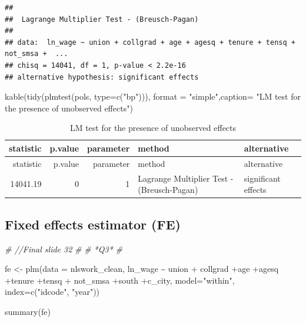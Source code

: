 \documentclass[
]{article}
\newenvironment{Shaded}{\begin{snugshade}}{\end{snugshade}}
\newcommand{\AttributeTok}[1]{\textcolor[rgb]{0.77,0.63,0.00}{#1}}
\newcommand{\CommentTok}[1]{\textcolor[rgb]{0.56,0.35,0.01}{\textit{#1}}}
\newcommand{\FunctionTok}[1]{\textcolor[rgb]{0.00,0.00,0.00}{#1}}
\newcommand{\NormalTok}[1]{#1}
\newcommand{\OtherTok}[1]{\textcolor[rgb]{0.56,0.35,0.01}{#1}}
\newcommand{\SpecialCharTok}[1]{\textcolor[rgb]{0.00,0.00,0.00}{#1}}
\newcommand{\StringTok}[1]{\textcolor[rgb]{0.31,0.60,0.02}{#1}}
\begin{document}
\begin{verbatim}
## 
##  Lagrange Multiplier Test - (Breusch-Pagan)
## 
## data:  ln_wage ~ union + collgrad + age + agesq + tenure + tensq + not_smsa +  ...
## chisq = 14041, df = 1, p-value < 2.2e-16
## alternative hypothesis: significant effects
\end{verbatim}

\begin{Shaded}
\begin{Highlighting}[]
  \FunctionTok{kable}\NormalTok{(}\FunctionTok{tidy}\NormalTok{(}\FunctionTok{plmtest}\NormalTok{(pols, }\AttributeTok{type=}\FunctionTok{c}\NormalTok{(}\StringTok{"bp"}\NormalTok{))), }\AttributeTok{format =} \StringTok{"simple"}\NormalTok{,}\AttributeTok{caption=}
          \StringTok{"LM test for the presence of unobserved effects"}\NormalTok{)}
\end{Highlighting}
\end{Shaded}

\begin{longtable}[]{@{}rrrll@{}}
\caption{LM test for the presence of unobserved effects}\tabularnewline
\toprule()
statistic & p.value & parameter & method & alternative \\
\midrule()
\endfirsthead
\toprule()
statistic & p.value & parameter & method & alternative \\
\midrule()
\endhead
14041.19 & 0 & 1 & Lagrange Multiplier Test - (Breusch-Pagan) &
significant effects \\
\bottomrule()
\end{longtable}

\hypertarget{fixed-effects-estimator-fe}{%
\subsection{Fixed effects estimator
(FE)}\label{fixed-effects-estimator-fe}}

\begin{Shaded}
\begin{Highlighting}[]
\CommentTok{\# //Final slide 32}
\CommentTok{\# }
\CommentTok{\# *Q3*}
\CommentTok{\#}

\NormalTok{  fe }\OtherTok{\textless{}{-}} \FunctionTok{plm}\NormalTok{(}\AttributeTok{data =}\NormalTok{ nlswork\_clean, ln\_wage }\SpecialCharTok{\textasciitilde{}}\NormalTok{ union }\SpecialCharTok{+}
\NormalTok{              collgrad }\SpecialCharTok{+}\NormalTok{age }\SpecialCharTok{+}\NormalTok{agesq }\SpecialCharTok{+}\NormalTok{tenure }\SpecialCharTok{+}\NormalTok{tensq }\SpecialCharTok{+}
\NormalTok{              not\_smsa }\SpecialCharTok{+}\NormalTok{south }\SpecialCharTok{+}\NormalTok{c\_city, }\AttributeTok{model=}\StringTok{"within"}\NormalTok{, }\AttributeTok{index=}\FunctionTok{c}\NormalTok{(}\StringTok{"idcode"}\NormalTok{, }\StringTok{"year"}\NormalTok{))}
      
      \FunctionTok{summary}\NormalTok{(fe)}
\end{Highlighting}
\end{Shaded}
\end{document}
